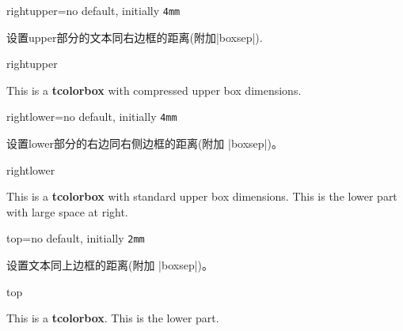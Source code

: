 \begin{docTcbKey}{rightupper}{=}{no default, initially \texttt{4mm}}

设置upper部分的文本同右边框的距离(附加|boxsep|).
\begin{exdispExample}{rightupper}

\begin{tcolorbox}[width=5cm,rightupper=2cm,title=My very long title text]
This is a \textbf{tcolorbox} with compressed upper box dimensions.
\end{tcolorbox}
\end{exdispExample}
\end{docTcbKey}





\begin{docTcbKey}{rightlower}{=}{no default, initially \texttt{4mm}}

设置lower部分的右边同右侧边框的距离(附加 |boxsep|)。
\begin{exdispExample}{rightlower}

\begin{tcolorbox}[width=5cm,rightlower=2cm]
This is a \textbf{tcolorbox} with standard upper box dimensions.
\tcblower
This is the lower part with large space at right.
\end{tcolorbox}
\end{exdispExample}
\end{docTcbKey}



\begin{docTcbKey}{top}{=}{no default, initially \texttt{2mm}}

设置文本同上边框的距离(附加 |boxsep|)。
\begin{exdispExample}{top}

\begin{tcolorbox}[top=0mm]
This is a \textbf{tcolorbox}.
\tcblower
This is the lower part.
\end{tcolorbox}
\end{exdispExample}
\end{docTcbKey}


